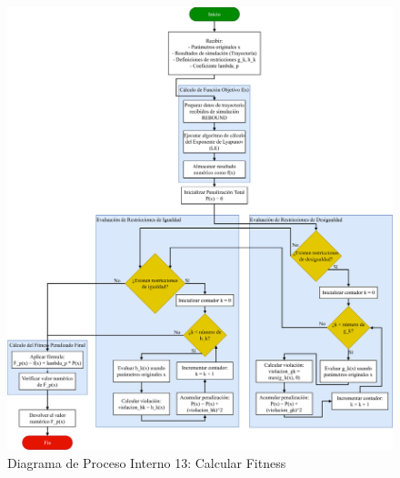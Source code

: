 \begin{figure}[H]
    \centering
    \includegraphics[width=\textwidth]{img/Analisis/DiagramaProcesos/DiagramaProceso13_CalcularFitness.png}
    \caption{Diagrama de Proceso Interno 13: Calcular Fitness}%
    \label{fig:process_diagram13}
\end{figure}

